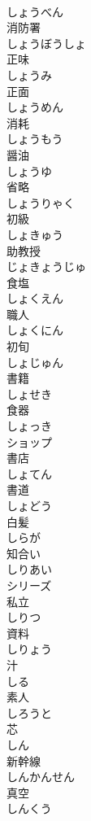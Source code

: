\documentclass[8pt]{extreport}
\begin{document}
\begin{CJK}{UTF8}{min}
\\	しょうべん	
\\	消防署 
\\	しょうぼうしょ	
\\	正味 
\\	しょうみ	
\\	正面 
\\	しょうめん	
\\	消耗 
\\	しょうもう	
\\	醤油 
\\	しょうゆ	
\\	省略 
\\	しょうりゃく	
\\	初級 
\\	しょきゅう	
\\	助教授 
\\	じょきょうじゅ	
\\	食塩 
\\	しょくえん	
\\	職人 
\\	しょくにん	
\\	初旬 
\\	しょじゅん	
\\	書籍 
\\	しょせき	
\\	食器 
\\	しょっき	
\\	ショップ	
\\	書店 
\\	しょてん	
\\	書道 
\\	しょどう	
\\	白髪 
\\	しらが	
\\	知合い 
\\	しりあい	
\\	シリーズ	
\\	私立 
\\	しりつ	
\\	資料 
\\	しりょう	
\\	汁 
\\	しる	
\\	素人 
\\	しろうと	
\\	芯 
\\	しん	
\\	新幹線 
\\	しんかんせん	
\\	真空 
\\	しんくう	

\end{CJK}
\end{document}

